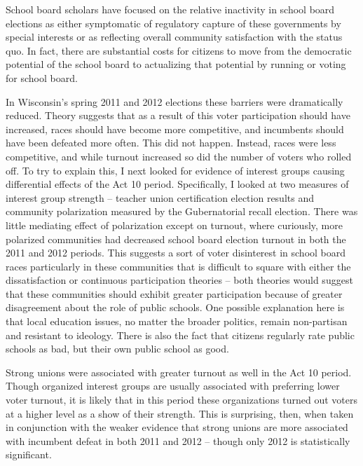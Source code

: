 School board scholars have focused on the relative inactivity in school board 
elections as either symptomatic of regulatory capture of these governments by 
special interests or as reflecting overall community satisfaction with the 
status quo. In fact, there are substantial costs for citizens to move from 
the democratic potential of the school board to actualizing that potential by 
running or voting for school board. 

In Wisconsin's spring 2011 and 2012 elections these barriers were dramatically 
reduced. Theory suggests that as a result of this voter participation should 
have increased, races should have become more competitive, and incumbents 
should have been defeated more often. This did not happen. Instead, races 
were less competitive, and while turnout increased so did the number of voters 
who rolled off. To try to explain this, I next looked for evidence of interest 
groups causing differential effects of the Act 10 period. Specifically, I looked at two measures 
of interest group strength -- teacher union certification election results and 
community polarization measured by the Gubernatorial recall election. There was 
little mediating effect of polarization except on turnout, where curiously, more 
polarized communities had decreased school board election turnout in both the 
2011 and 2012 periods. This suggests a sort of voter disinterest in school board 
races particularly in these communities that is difficult to square with either 
the dissatisfaction or continuous participation theories -- both theories would 
suggest that these communities should exhibit greater participation because of 
greater disagreement about the role of public schools. One possible explanation 
here is that local education issues, no matter the broader politics, remain 
non-partisan and resistant to ideology. There is also the fact that citizens 
regularly rate public schools as bad, but their own public school as good. 

Strong unions were associated with greater turnout as well in the Act 10 period. 
Though organized interest groups are usually associated with preferring lower 
voter turnout, it is likely that in this period these organizations turned out 
voters at a higher level as a show of their strength. This is surprising, then, 
when taken in conjunction with the weaker evidence that strong unions are more 
associated with incumbent defeat in both 2011 and 2012 -- though only 2012 is 
statistically significant. 

